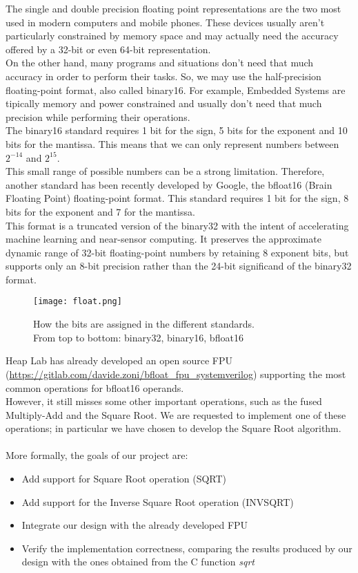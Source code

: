 The single and double precision floating point representations are the two most used in modern computers and mobile phones. These devices usually aren’t particularly constrained by memory space and may actually need the accuracy offered by a 32-bit or even 64-bit representation.\\
On the other hand, many programs and situations don’t need that much accuracy in order to perform their tasks. So, we may use the half-precision floating-point format, also called binary16. For example, Embedded Systems are tipically memory and power constrained and usually don't need that much precision while performing their operations. \\
The binary16 standard requires 1 bit for the sign, 5 bits for the exponent and 10 bits for the mantissa. This means that we can only represent numbers between $2^{-14}$ and $2^{15}$.\\
This small range of possible numbers can be a strong limitation. Therefore, another standard has been recently developed by Google, the bfloat16 (Brain Floating Point) floating-point format. This standard requires 1 bit for the sign, 8 bits for the exponent and 7 for the mantissa. \\
This format is a truncated version of the binary32 with the intent of accelerating machine learning and near-sensor computing. It preserves the approximate dynamic range of 32-bit floating-point numbers by retaining 8 exponent bits, but supports only an 8-bit precision rather than the 24-bit significand of the binary32 format. 

\begin{figure}[h]
	\centering
	\captionsetup{justification=centering}
	\texttt{[image: float.png]}	
	\caption{How the bits are assigned in the different standards. \\From top to bottom: binary32, binary16, bfloat16}
\end{figure}

Heap Lab has already developed an open source FPU (\url{https://gitlab.com/davide.zoni/bfloat_fpu_systemverilog}) supporting the most common operations for bfloat16 operands. \\
However, it still misses some other important operations, such as the fused Multiply-Add and the Square Root. We are requested to implement one of these operations; in particular we have chosen to develop the Square Root algorithm.\\
\\
More formally, the goals of our project are:
\begin{itemize}
	\item Add support for Square Root operation (SQRT)
	\item Add support for the Inverse Square Root operation (INVSQRT)
	\item Integrate our design with the already developed FPU
	\item Verify the implementation correctness, comparing the results produced by our design with the ones obtained from the C function \emph{sqrt}
\end{itemize}

